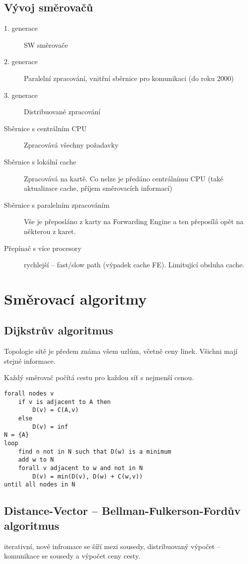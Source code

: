 \documentclass[a4paper, 11pt]{report}
\begin{document}
\subsection{Vývoj směrovačů}
\begin{description}
	\item[1. generace] SW směrovače
	\item[2. generace] Paralelní zpracování, vnitřní sběrnice pro komunikaci (do roku 2000)
	\item[3. generace] Distribuované zpracování
\end{description}

\begin{description}
	\item[Sběrnice s centrálním CPU] Zpracovává všechny požadavky
	\item[Sběrnice s lokální cache] Zpracovává na kartě. Co nelze je předáno centrálnímu CPU (také aktualizace cache, příjem směrovacích informací)
	\item[Sběrnice s paralelním zpracováním] Vše je přeposláno z karty na Forwarding Engine a ten přeposílá opět na některou z karet.
	\item[Přepínač s více procesory] rychlejší -- fast/slow path (výpadek cache FE). Limitující obsluha cache.
\end{description}

\section{Směrovací algoritmy}

\subsection{Dijkstrův algoritmus}
Topologie sítě je předem známa všem uzlům, včetně ceny linek. Všichni mají stejné informace.

Každý směrovač počítá cestu pro každou síť s nejmenší cenou.

\begin{lstlisting}
forall nodes v
	if v is adjacent to A then
		D(v) = C(A,v)
	else
		D(v) = inf
N = {A}
loop
	find n not in N such that D(w) is a minimum
	add w to N
	forall v adjacent to w and not in N
		D(v) = min(D(v), D(w) + C(w,v))
until all nodes in N
\end{lstlisting}

\subsection{Distance-Vector -- Bellman-Fulkerson-Fordův algoritmus}
iterativní, nové infromace se šíří mezi sousedy, distribuovaný výpočet -- komunikace se sousedy a výpočet ceny cesty.
\end{document}
